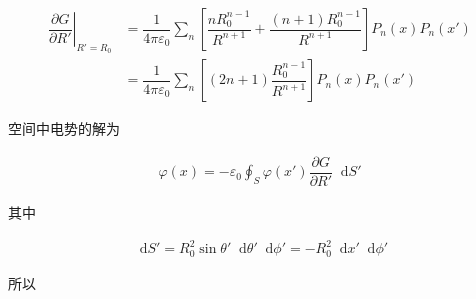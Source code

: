 \documentclass{article}
\newcommand*{\md}{\mathop{}\!\mathrm{d}}
\begin{document}
\begin{equation*}
  \begin{aligned}
    \left. \dfrac{\partial G}{\partial R'} \right|_{R'=R_0} &=
    \dfrac{1}{4\pi \varepsilon_0} \sum_n \left[ \dfrac{n R_0^{n-1}}{R^{n+1}} + \dfrac{ \left( n+1 \right) R_0^{n-1}}{R^{n+1}} \right] P_n \left( x \right) P_n \left( x' \right) \\
    &= \dfrac{1}{4\pi \varepsilon_0} \sum_n \left[ \left( 2n+1 \right) \dfrac{R_0^{n-1} }{R^{n+1}} \right] P_n \left( x \right) P_n \left( x' \right)
  \end{aligned}
\end{equation*}

空间中电势的解为

\begin{equation*}
  \begin{aligned}
    \varphi \left( x \right) = - \varepsilon_0 \oint_S \varphi \left( x' \right) \dfrac{\partial G}{\partial R'}  \md S'
  \end{aligned}
\end{equation*}

其中

\begin{equation*}
  \begin{aligned}
    \md S' = R_0^2 \sin \theta' \md \theta' \md \phi' = - R_0^2 \md x' \md \phi'
  \end{aligned}
\end{equation*}

所以
\end{document}
